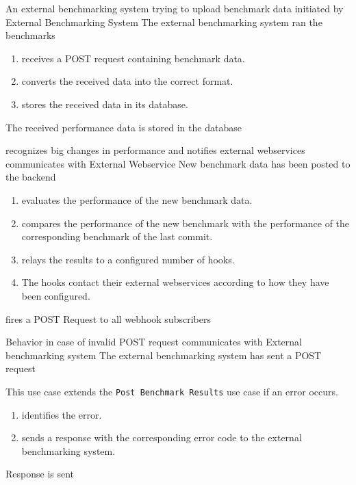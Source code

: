 \bigskip

{An external \gls{benchmarking system} trying to upload benchmark data}
{initiated by External Benchmarking System}
{The external \gls{benchmarking system} ran the benchmarks}
{\begin{enumerate}
    \item \parkview{} receives a POST request containing benchmark data.
    \item \parkview{} converts the received data into the correct format.
    \item \parkview{} stores the received data in its database.
\end{enumerate}}
{The received performance data is stored in the database}

\bigskip

{\parkview{} recognizes big changes in performance and notifies external webservices}
{communicates with External Webservice}
{New benchmark data has been posted to the backend}
{\begin{enumerate}
    \item \parkview{} evaluates the performance of the new benchmark data.
    \item \parkview{} compares the performance of the new benchmark with the performance of the corresponding benchmark of the last commit.
    \item \parkview{} relays the results to a configured number of hooks.
    \item The hooks contact their external webservices according to how they have been configured.
\end{enumerate}}
{\parkview{} fires a POST Request to all webhook subscribers}

\bigskip

{Behavior in case of invalid POST request}
{communicates with External \Gls{benchmarking system}}
{The external \gls{benchmarking system} has sent a POST request}
{This use case extends the \texttt{Post Benchmark Results} use case if an error occurs.
\begin{enumerate}
    \item \parkview{} identifies the error.
    \item \parkview{} sends a response with the corresponding error code to the external \gls{benchmarking system}.
\end{enumerate}}
{Response is sent}


